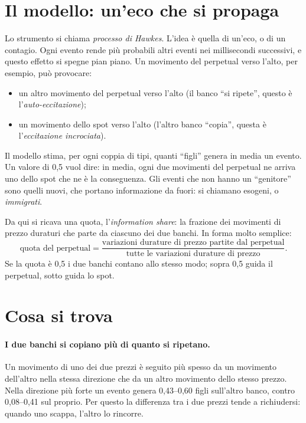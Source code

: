 \documentclass[a4paper,11pt]{article}
\begin{document}
\section*{Il modello: un'eco che si propaga}

Lo strumento si chiama \emph{processo di Hawkes}. L'idea è quella di un'eco, o di un contagio. Ogni evento rende più probabili altri eventi nei millisecondi successivi, e questo effetto si spegne pian piano. Un movimento del perpetual verso l'alto, per esempio, può provocare:
\begin{itemize}
\item un altro movimento del perpetual verso l'alto (il banco \enquote{si ripete}, questo è l'\emph{auto-eccitazione});
\item un movimento dello spot verso l'alto (l'altro banco \enquote{copia}, questa è l'\emph{eccitazione incrociata}).
\end{itemize}

Il modello stima, per ogni coppia di tipi, quanti \enquote{figli} genera in media un evento. Un valore di 0,5 vuol dire: in media, ogni due movimenti del perpetual ne arriva uno dello spot che ne è la conseguenza. Gli eventi che non hanno un \enquote{genitore} sono quelli nuovi, che portano informazione da fuori: si chiamano esogeni, o \emph{immigrati}.

Da qui si ricava una quota, l'\emph{information share}: la frazione dei movimenti di prezzo duraturi che parte da ciascuno dei due banchi. In forma molto semplice:
\begin{equation*}
\text{quota del perpetual} = \frac{\text{variazioni durature di prezzo partite dal perpetual}}{\text{tutte le variazioni durature di prezzo}} .
\end{equation*}
Se la quota è 0,5 i due banchi contano allo stesso modo; sopra 0,5 guida il perpetual, sotto guida lo spot.

\section*{Cosa si trova}

\paragraph{I due banchi si copiano più di quanto si ripetano.} Un movimento di uno dei due prezzi è seguito più spesso da un movimento dell'altro nella stessa direzione che da un altro movimento dello stesso prezzo. Nella direzione più forte un evento genera 0,43--0,60 figli sull'altro banco, contro 0,08--0,41 sul proprio. Per questo la differenza tra i due prezzi tende a richiudersi: quando uno scappa, l'altro lo rincorre.
\end{document}
